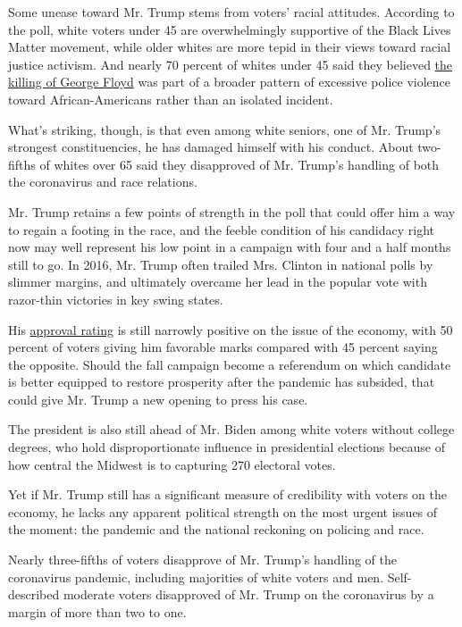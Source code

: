 Some unease toward Mr. Trump stems from voters' racial attitudes.
According to the poll, white voters under 45 are overwhelmingly
supportive of the Black Lives Matter movement, while older whites are
more tepid in their views toward racial justice activism. And nearly 70
percent of whites under 45 said they believed
\href{https://www.nytimes3xbfgragh.onion/2020/05/31/us/george-floyd-investigation.html}{the
killing of George Floyd} was part of a broader pattern of excessive
police violence toward African-Americans rather than an isolated
incident.

What's striking, though, is that even among white seniors, one of Mr.
Trump's strongest constituencies, he has damaged himself with his
conduct. About two-fifths of whites over 65 said they disapproved of Mr.
Trump's handling of both the coronavirus and race relations.

Mr. Trump retains a few points of strength in the poll that could offer
him a way to regain a footing in the race, and the feeble condition of
his candidacy right now may well represent his low point in a campaign
with four and a half months still to go. In 2016, Mr. Trump often
trailed Mrs. Clinton in national polls by slimmer margins, and
ultimately overcame her lead in the popular vote with razor-thin
victories in key swing states.

His
\href{https://www.nytimes3xbfgragh.onion/2020/06/28/us/politics/trump-approval-older-voters-coronavirus.html}{approval
rating} is still narrowly positive on the issue of the economy, with 50
percent of voters giving him favorable marks compared with 45 percent
saying the opposite. Should the fall campaign become a referendum on
which candidate is better equipped to restore prosperity after the
pandemic has subsided, that could give Mr. Trump a new opening to press
his case.

The president is also still ahead of Mr. Biden among white voters
without college degrees, who hold disproportionate influence in
presidential elections because of how central the Midwest is to
capturing 270 electoral votes.

Yet if Mr. Trump still has a significant measure of credibility with
voters on the economy, he lacks any apparent political strength on the
most urgent issues of the moment: the pandemic and the national
reckoning on policing and race.

Nearly three-fifths of voters disapprove of Mr. Trump's handling of the
coronavirus pandemic, including majorities of white voters and men.
Self-described moderate voters disapproved of Mr. Trump on the
coronavirus by a margin of more than two to one.

